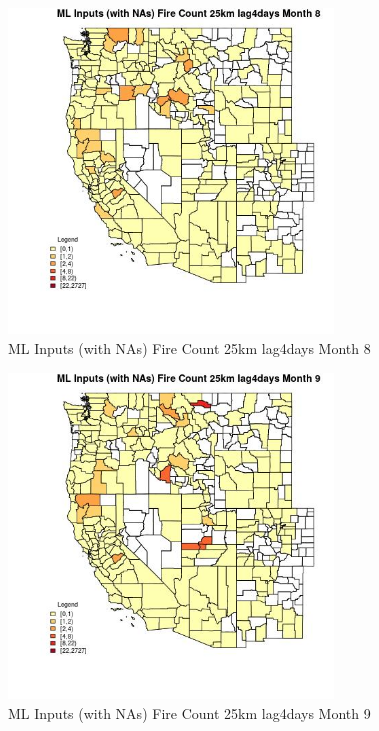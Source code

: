 \begin{figure} 
\centering  
\includegraphics[width=0.77\textwidth]{Code_Outputs/Report_ML_input_PM25_Step4_part_f_de_duplicated_aves_prioritize_24hr_obswNAs_CountyFire_Count_25km_lag4daysmedianMonth8.jpg} 
\caption{\label{fig:Report_ML_input_PM25_Step4_part_f_de_duplicated_aves_prioritize_24hr_obswNAsCountyFire_Count_25km_lag4daysmedianMonth8}ML Inputs (with NAs) Fire Count 25km lag4days Month 8} 
\end{figure} 
 

\clearpage 

\begin{figure} 
\centering  
\includegraphics[width=0.77\textwidth]{Code_Outputs/Report_ML_input_PM25_Step4_part_f_de_duplicated_aves_prioritize_24hr_obswNAs_CountyFire_Count_25km_lag4daysmedianMonth9.jpg} 
\caption{\label{fig:Report_ML_input_PM25_Step4_part_f_de_duplicated_aves_prioritize_24hr_obswNAsCountyFire_Count_25km_lag4daysmedianMonth9}ML Inputs (with NAs) Fire Count 25km lag4days Month 9} 
\end{figure} 
 

